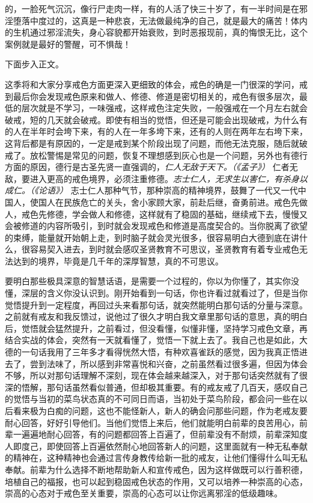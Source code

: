\begin{case}
的，一脸死气沉沉，像行尸走肉一样，有的人活了快三十岁了，有一半时间是在邪淫堕落中度过的，这真是一种悲哀，无法做最纯净的自己，就是最大的痛苦！体内的生机通过邪淫流失，身心容貌都开始衰败，到时恶报现前，真的悔恨无比，这个案例就是最好的警醒，可不惧哉！
\end{case}

下面步入正文。

这季将和大家分享戒色方面更深入更细致的体会，戒色的确是一门很深的学问，戒到最后你会发现戒色原来和做人、修德、修道是密切相关的，戒色有很多层次，最低的层次就是不学习，一味强戒，这样戒色注定失败，一般强戒在一个月左右就会破戒，短的几天就会破戒。即使有相当的觉悟，但还是可能会出现破戒，为什么有的人在半年时会垮下来，有的人在一年多垮下来，还有的人则在两年左右垮下来，这背后都是有原因的，一定是戒到某个阶段出现了问题，而他无法克服，随后就破戒了。放松警惕是常见的问题，恢复不理想感到灰心也是一个问题，另外也有德行方面的原因，德行是古圣先贤一直强调的，\textit{仁人无敌于天下。（《孟子》）} 仁者无敌，要进入更高的戒色境界，必须注重修德。\textit{志士仁人，无求生以害仁，有杀身以成仁。（《论语》）} 志士仁人那种气节，那种崇高的精神境界，鼓舞了一代又一代中国人，使国人在民族危亡的关头，舍小家顾大家，前赴后继，奋勇前进。戒色先做人，戒色先修德，学会做人和修德，这样就有了稳固的基础，继续戒下去，慢慢又会被修道的内容所吸引，到时就会发现戒色和修道是高度契合的。当你脱离了欲望的束缚，能量就开始朝上走，到时脑子就会灵光很多，很容易明白大德到底在讲什么，很容易契入进去，到时就会感叹圣贤教育不可思议，圣贤教育有着专业戒色无法达到的境界，毕竟是几千年的深厚智慧，真的不可思议。

要明白那些极具深意的智慧话语，是需要一个过程的，你以为你懂了，其实你没懂，深层的含义你没认识到。刚开始看到一句话，你也许看过就看过了，但是当你觉悟提升到一定程度，再回过头来看那句话，就突然能明白那句话的分量与深意。之前就有戒友和我反馈过，说他过了很久才明白我文章里那句话的意思，真的明白后，觉悟就会猛然提升，之前看过，但没看懂，似懂非懂，坚持学习戒色文章，再结合实战的体会，突然有一天就看懂了，觉悟一下就上去了。我自己也是如此，大德的一句话我用了三年多才看得恍然大悟，有种欢喜雀跃的感觉，因为我真正悟进去了，尝到法味了，所以感到非常喜悦和兴奋，之前虽然看过很多遍，但因为体会不够，所以对那句话理解不深刻，现在体会越来越深入，对于那句话突然就有了很深的悟解，那句话虽然看似普通，但却极其重要。有的戒友戒了几百天，感叹自己的觉悟与当初的菜鸟状态真的不可同日而语，当初处于菜鸟阶段，都会问一些在以后看来极为白痴的问题，这也不能怪新人，新人的确会问那些问题，作为老戒友要耐心回答，好好引导他们。当他们觉悟上来后，他们就能明白前辈的良苦用心，前辈一遍遍地耐心回答，有的问题都回答上百遍了，但前辈没有不耐烦，前辈深知度人即度己，即使回答上百遍依然耐心地回答新人的问题，这里面就有一种无私奉献的精神在，这种精神也会通过言传身教传给新一批的戒友，让他们懂得什么叫无私奉献。前辈为什么选择不断地帮助新人和宣传戒色，因为这样做既可以行善积德，培植自己的福报，也可以起到稳固戒色状态的作用，又可以培养一种崇高的心态，崇高的心态对于戒色至关重要，崇高的心态可以让你远离邪淫的低级趣味。

